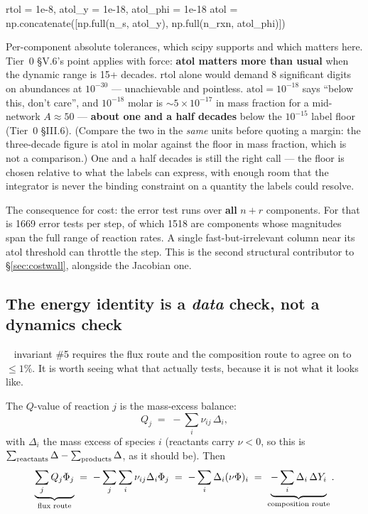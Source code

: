 \begin{srclisting}
rtol = 1e-8, atol_y = 1e-18, atol_phi = 1e-18
atol = np.concatenate([np.full(n_s, atol_y), np.full(n_rxn, atol_phi)])
\end{srclisting}

Per-component absolute tolerances, which scipy supports and which matters here.
Tier~0 \S V.6's point applies with force: \textbf{atol matters more than usual}
when the dynamic range is 15+ decades. rtol alone would demand 8 significant
digits on abundances at $10^{-30}$ --- unachievable and pointless.
$\mathrm{atol} = 10^{-18}$ says ``below this, don't care'', and $10^{-18}$ molar
is ${\sim}5\times10^{-17}$ in mass fraction for a mid-network $A \approx 50$ ---
\textbf{about one and a half decades} below the $10^{-15}$ label floor (Tier~0
\S III.6). (Compare the two in the \emph{same} units before quoting a margin:
the three-decade figure is atol in molar against the floor in mass fraction,
which is not a comparison.) One and a half decades is still the right call ---
the floor is chosen relative to what the labels can express, with enough room
that the integrator is never the binding constraint on a quantity the labels
could resolve.

The consequence for cost: the error test runs over \textbf{all} $n + r$
components. For  that is 1669 error tests per step, of which 1518 are
\Phifl{} components whose magnitudes span the full range of reaction rates. A
single fast-but-irrelevant column near its atol threshold can throttle the step.
This is the second structural contributor to \S\ref{sec:costwall}, alongside the
Jacobian one.

\subsection{The energy identity is a \emph{data} check, not a dynamics check}
\label{sec:energyidentity}

\begin{warn}
\warnglyph{}~ invariant \#5 requires the flux route and the
composition route to agree on \enuc{} to $\le 1\%$. It is worth seeing what that
actually tests, because it is not what it looks like.
\end{warn}

The $Q$-value of reaction $j$ is the mass-excess balance:
%
\begin{equation}
Q_j \;=\; -\sum_i \nu_{ij}\,\Delta_i ,
\label{eq:qvalue}
\end{equation}
%
with $\Delta_i$ the mass excess of species $i$ (reactants carry $\nu < 0$, so
this is $\sum_{\rm reactants}\Delta - \sum_{\rm products}\Delta$, as it should
be). Then
%
\begin{equation}
\underbrace{\sum_j Q_j\Phi_j}_{\text{flux route}}
\;=\; -\sum_j\sum_i \nu_{ij}\Delta_i\Phi_j
\;=\; -\sum_i \Delta_i(\nu\Phi)_i
\;=\; \underbrace{-\sum_i \Delta_i\,\Delta Y_i}_{\text{composition route}} .
\label{eq:energycollapse}
\end{equation}

